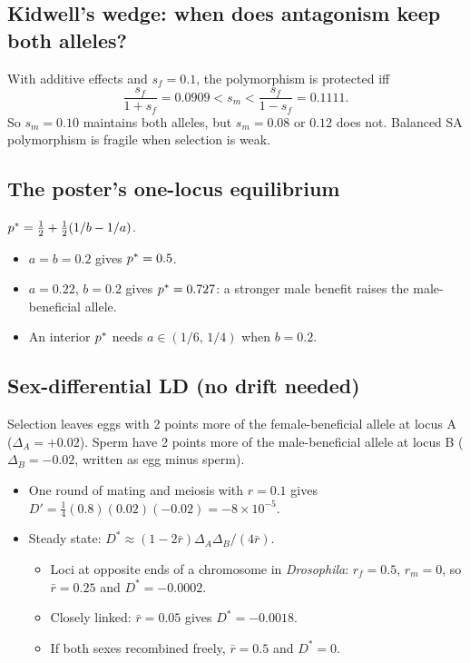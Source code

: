 \subsection{Kidwell's wedge: when does antagonism keep both alleles?}
With additive effects and $s_f=0.1$, the polymorphism is protected iff
\[
\frac{s_f}{1+s_f}=0.0909<s_m<\frac{s_f}{1-s_f}=0.1111.
\]
So $s_m=0.10$ maintains both alleles, but $s_m=0.08$ or $0.12$ does not. Balanced SA polymorphism is fragile when selection is weak.

\subsection{The poster's one-locus equilibrium}
$p^{*}=\tfrac12+\tfrac12(1/b-1/a)$.
\begin{itemize}
\item $a=b=0.2$ gives $p^{*}=0.5$.
\item $a=0.22$, $b=0.2$ gives $p^{*}=0.727$: a stronger male benefit raises the male-beneficial allele.
\item An interior $p^{*}$ needs $a\in(1/6,\,1/4)$ when $b=0.2$.
\end{itemize}

\subsection{Sex-differential LD (no drift needed)}
Selection leaves eggs with 2 points more of the female-beneficial allele at locus A ($\Delta_A=+0.02$). Sperm have 2 points more of the male-beneficial allele at locus B ($\Delta_B=-0.02$, written as egg minus sperm).
\begin{itemize}
\item One round of mating and meiosis with $r=0.1$ gives $D'=\tfrac14(0.8)(0.02)(-0.02)=-8\times10^{-5}$.
\item Steady state: $D^*\approx(1-2\bar r)\Delta_A\Delta_B/(4\bar r)$.
  \begin{itemize}
  \item Loci at opposite ends of a chromosome in \emph{Drosophila}: $r_f=0.5$, $r_m=0$, so $\bar r=0.25$ and $D^*=-0.0002$.
  \item Closely linked: $\bar r=0.05$ gives $D^*=-0.0018$.
  \item If both sexes recombined freely, $\bar r=0.5$ and $D^*=0$.
  \end{itemize}
\end{itemize}

